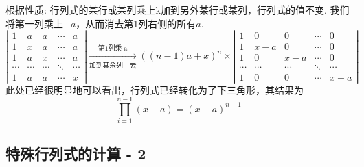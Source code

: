 \documentclass[12pt, a4paper, oneside]{ctexbook}
\begin{document}
根据性质: 行列式的某行或某列乘上k加到另外某行或某列，行列式的值不变. 我们将第一列乘上$-a$，从而消去第1列右侧的所有$a$. 
$$\left | \begin{matrix}
    1 & a & a & \cdots & a \\
    1 & x & a & \cdots & a \\
    1 & a & x & \cdots & a \\
    \cdots & \cdots & \cdots & \ddots & \cdots \\
    1 & a & a & \cdots & x
\end{matrix} \right | \xrightarrow[\mbox{加到其余列上去}]{\mbox{第1列乘-a}} ((n-1)a+x)^n \times \left | \begin{matrix}
    1 & 0   & 0   & \cdots & 0 \\
    1 & x-a & 0   & \cdots & 0 \\
    1 & 0   & x-a & \cdots & 0 \\
    \cdots & \cdots & \cdots & \ddots & \cdots \\
    1 & 0   & 0   & \cdots & x-a 
\end{matrix} \right |$$
此处已经很明显地可以看出，行列式已经转化为了下三角形，其结果为$$\prod_{i=1}^{n-1}(x-a) = (x-a)^{n-1}$$

\subsection{特殊行列式的计算 - 2}
\end{document}
